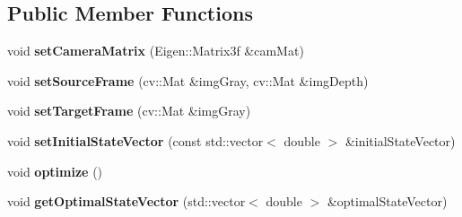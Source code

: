 \subsection*{Public Member Functions}
\begin{DoxyCompactItemize}
\item 
\hypertarget{class_photoconsistency_odometry_ceres_1_1_c_photoconsistency_odometry_ceres_a33e2c233258954ea85a3d81902618852}{
void {\bfseries setCameraMatrix} (Eigen::Matrix3f \&camMat)}
\label{class_photoconsistency_odometry_ceres_1_1_c_photoconsistency_odometry_ceres_a33e2c233258954ea85a3d81902618852}

\item 
\hypertarget{class_photoconsistency_odometry_ceres_1_1_c_photoconsistency_odometry_ceres_a78f20796bdb619d6e5a53a5610de5589}{
void {\bfseries setSourceFrame} (cv::Mat \&imgGray, cv::Mat \&imgDepth)}
\label{class_photoconsistency_odometry_ceres_1_1_c_photoconsistency_odometry_ceres_a78f20796bdb619d6e5a53a5610de5589}

\item 
\hypertarget{class_photoconsistency_odometry_ceres_1_1_c_photoconsistency_odometry_ceres_a38b679a8d0050258b1feb6ffb7a0ecf0}{
void {\bfseries setTargetFrame} (cv::Mat \&imgGray)}
\label{class_photoconsistency_odometry_ceres_1_1_c_photoconsistency_odometry_ceres_a38b679a8d0050258b1feb6ffb7a0ecf0}

\item 
\hypertarget{class_photoconsistency_odometry_ceres_1_1_c_photoconsistency_odometry_ceres_a07d65d9fe91f55f3fb61c0b6283c3755}{
void {\bfseries setInitialStateVector} (const std::vector$<$ double $>$ \&initialStateVector)}
\label{class_photoconsistency_odometry_ceres_1_1_c_photoconsistency_odometry_ceres_a07d65d9fe91f55f3fb61c0b6283c3755}

\item 
\hypertarget{class_photoconsistency_odometry_ceres_1_1_c_photoconsistency_odometry_ceres_a109048ffe22019a79c8933db463daef4}{
void {\bfseries optimize} ()}
\label{class_photoconsistency_odometry_ceres_1_1_c_photoconsistency_odometry_ceres_a109048ffe22019a79c8933db463daef4}

\item 
\hypertarget{class_photoconsistency_odometry_ceres_1_1_c_photoconsistency_odometry_ceres_af7b585a5b4edbfa81bf877c3e9ff7e4d}{
void {\bfseries getOptimalStateVector} (std::vector$<$ double $>$ \&optimalStateVector)}
\label{class_photoconsistency_odometry_ceres_1_1_c_photoconsistency_odometry_ceres_af7b585a5b4edbfa81bf877c3e9ff7e4d}


\end{DoxyCompactItemize}
